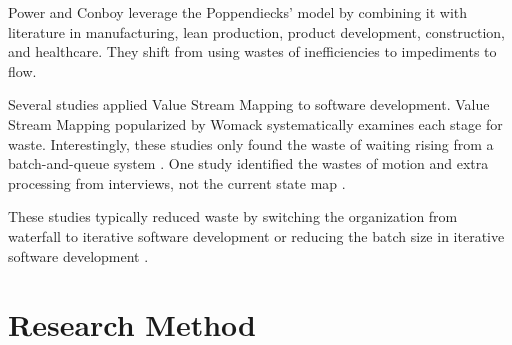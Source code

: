 Power and Conboy leverage the Poppendiecks' model by combining it with literature in manufacturing, lean production, product development, construction, and healthcare. They shift from using wastes of inefficiencies to impediments to flow. \cite{PowerImpediments}


Several studies applied Value Stream Mapping to software development. Value Stream Mapping popularized by Womack systematically examines each stage for waste. Interestingly, these studies only found the waste of waiting rising from a batch-and-queue system \cite{Ali2016, Khurum2014, Mujtaba2010}. One study identified the wastes of motion and extra processing from interviews, not the current state map \cite{Mujtaba2010}.



These studies typically reduced waste by switching the organization from waterfall to iterative software development or reducing the batch size in iterative software development \cite{Ali2016, Khurum2014, Mujtaba2010}.

\section{Research Method}
\label{ResearchMethod}

